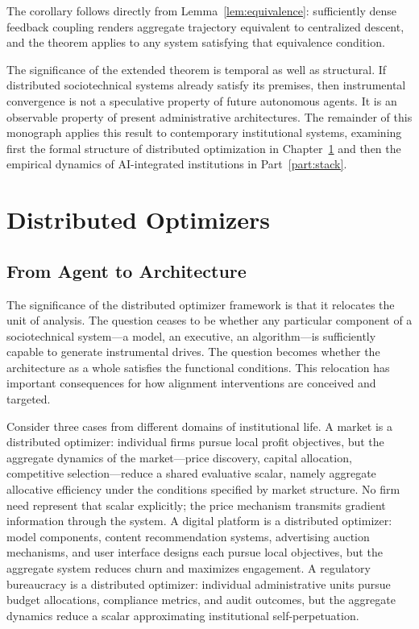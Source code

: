 \documentclass[12pt, oneside]{book}
\theoremstyle{plain}
\theoremstyle{definition}
\theoremstyle{remark}
\theoremstyle{definition}
\begin{document}
The corollary follows directly from Lemma~\ref{lem:equivalence}: sufficiently dense
feedback coupling renders aggregate trajectory equivalent to centralized descent, and
the theorem applies to any system satisfying that equivalence condition.

The significance of the extended theorem is temporal as well as structural. If
distributed sociotechnical systems already satisfy its premises, then instrumental
convergence is not a speculative property of future autonomous agents. It is an
observable property of present administrative architectures. The remainder of this
monograph applies this result to contemporary institutional systems, examining first
the formal structure of distributed optimization in Chapter~\ref{ch:distributed} and
then the empirical dynamics of AI-integrated institutions in Part~\ref{part:stack}.

\chapter{Distributed Optimizers}
\label{ch:distributed}

\section{From Agent to Architecture}

The significance of the distributed optimizer framework is that it relocates the
unit of analysis. The question ceases to be whether any particular component of a
sociotechnical system---a model, an executive, an algorithm---is sufficiently
capable to generate instrumental drives. The question becomes whether the
architecture as a whole satisfies the functional conditions. This relocation has
important consequences for how alignment interventions are conceived and targeted.

Consider three cases from different domains of institutional life. A market is a
distributed optimizer: individual firms pursue local profit objectives, but the
aggregate dynamics of the market---price discovery, capital allocation, competitive
selection---reduce a shared evaluative scalar, namely aggregate allocative efficiency
under the conditions specified by market structure. No firm need represent that scalar
explicitly; the price mechanism transmits gradient information through the system.
A digital platform is a distributed optimizer: model components, content recommendation
systems, advertising auction mechanisms, and user interface designs each pursue local
objectives, but the aggregate system reduces churn and maximizes engagement. A
regulatory bureaucracy is a distributed optimizer: individual administrative units
pursue budget allocations, compliance metrics, and audit outcomes, but the aggregate
dynamics reduce a scalar approximating institutional self-perpetuation.
\end{document}
